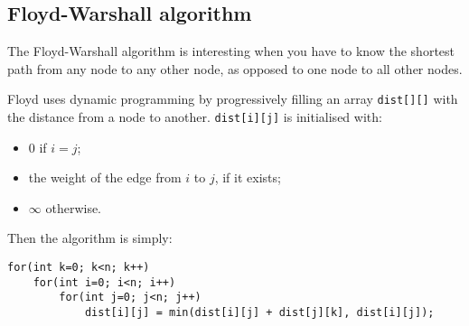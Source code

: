 \subsection{Floyd-Warshall algorithm}

The Floyd-Warshall algorithm is interesting
when you have to know the shortest path
from any node to any other node, as opposed to one node to all other nodes.

Floyd uses dynamic programming by progressively filling an array
\texttt{dist[][]} with the distance from a node to another.
\texttt{dist[i][j]} is initialised with:
\begin{itemize}
    \item 0 if $i=j$;
    \item the weight of the edge from $i$ to $j$, if it exists;
    \item $\infty$ otherwise.
\end{itemize}

Then the algorithm is simply:
\begin{verbatim}
for(int k=0; k<n; k++)
    for(int i=0; i<n; i++)
        for(int j=0; j<n; j++)
            dist[i][j] = min(dist[i][j] + dist[j][k], dist[i][j]);
\end{verbatim}
